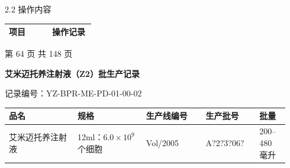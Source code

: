 \documentclass[UTF8,10pt,a4paper,fontset=fandol]{ctexart}
\newcommand{\fieldvalue}[1]{#1}
\newcommand{\handwritten}[1]{#1}
\begin{document}
\vspace{0.5em}

2.2 操作内容

\begin{tabular}{|p{0.48\linewidth}|p{0.48\linewidth}|}
\hline
项目 & 操作记录 \\
\hline
\end{tabular}

\vfill

\begin{center}
第 64 页 共 148 页
\end{center}

\newpage

\begin{center}
{\large \textbf{艾米迈托养注射液（Z2）批生产记录}}
\end{center}

\noindent
记录编号：YZ-BPR-ME-PD-01-00-02

\begin{center}
\small
\begin{tabular}{|p{0.23\linewidth}|p{0.23\linewidth}|p{0.20\linewidth}|p{0.18\linewidth}|p{0.10\linewidth}|}
\hline
品名 & 规格 & 生产线编号 & 生产批号 & 批量\\
\hline
艾米迈托养注射液 & 12ml：$6.0\times10^9$个细胞 &
\fieldvalue{\handwritten{Vol/2005}} &
\fieldvalue{\handwritten{A?2?3?06?}} &
200--480 毫升\\
\hline
\end{tabular}
\end{center}
\end{document}
